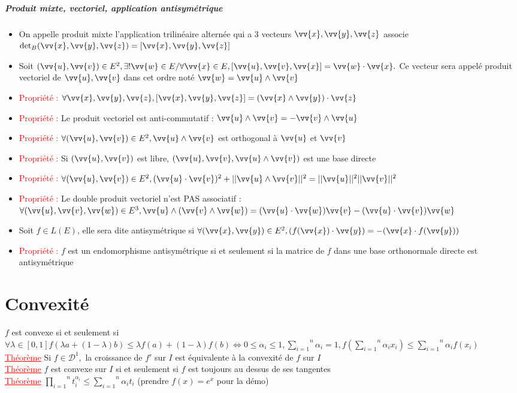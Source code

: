 \documentclass[a4paper, 11pts, french]{article}
\newcommand{\p}{\wedge}
\newcommand{\D}{\mathcal{D}}
\newcommand{\al}{\alpha}
\newcommand{\la}{\lambda}
\newcommand{\som}[2]{\overset{#2}{\underset{#1}{\sum}}}
\newcommand{\produit}[2]{\overset{#2}{\underset{#1}{\prod}}}
\newcommand{\thm}{\textcolor{red}{\underline{Théorème} }}
\newcommand{\ppt}{\textcolor{red}{Propriété : }}
\begin{document}
	 \subparagraph{Produit mixte, vectoriel, application antisymétrique}
	 \begin{itemize}
		\item On appelle produit mixte l'application trilinéaire alternée qui a 3 vecteurs $\vv{x}, \vv{y}, \vv{z}$ associe $\det_B(\vv{x},\vv{y},\vv{z})=[\vv{x},\vv{y},\vv{z}]$
		\item Soit $(\vv{u},\vv{v}) \in E^2, \exists! \vv{w} \in E / \forall \vv{x} \in E, [\vv{u},\vv{v},\vv{x}]=\vv{w}\cdot\vv{x}.$ Ce vecteur sera appelé produit vectoriel de $\vv{u},\vv{v}$ dans cet ordre noté $\vv{w}=\vv{u}\p\vv{v}$
		\item \ppt $\forall \vv{x},\vv{y},\vv{z}, [\vv{x},\vv{y},\vv{z}]=(\vv{x}\p\vv{y})\cdot\vv{z}$
		\item \ppt Le produit vectoriel est anti-commutatif : $\vv{u}\p\vv{v}=-\vv{v}\p\vv{u}$
		\item \ppt $\forall (\vv{u},\vv{v}) \in E^2, \vv{u}\p\vv{v}$ est orthogonal à $\vv{u}$ et $\vv{v}$
		\item \ppt Si $(\vv{u},\vv{v})$ est libre, $(\vv{u},\vv{v},\vv{u}\p\vv{v})$ est une base directe
		\item \ppt $\forall (\vv{u},\vv{v}) \in E^2, (\vv{u}\cdot\vv{v})^2+||\vv{u}\p\vv{v}||^2=||\vv{u}||^2||\vv{v}||^2$
		\item \ppt Le double produit vectoriel n'est PAS associatif : $\forall (\vv{u},\vv{v},\vv{w}) \in E^3,\\ {\vv{u}\p (\vv{v} \p \vv{w})=(\vv{u} \cdot \vv{w})\vv{v}-(\vv{u} \cdot \vv{v})\vv{w}}$
		\item Soit $f \in L(E)$, elle sera dite antisymétrique si $\forall (\vv{x},\vv{y}) \in E^2, (f(\vv{x})\cdot\vv{y})=-(\vv{x}\cdot f(\vv{y}))$
		\item \ppt $f$ est un endomorphisme antisymétrique si et seulement si la matrice de $f$ dans une base orthonormale directe est antisymétrique
	 \end{itemize}


	 \section{Convexité}
	  $f$ est convexe si et seulement si $\forall \la \in [0,1] f(\la a+(1-\la)b) \leqslant \la f(a)+(1-\la)f(b) \iff 0 \leqslant \al_i \leqslant 1, \som{i=1}{n}\al_i=1, f(\som{i=1}{n}\al_i x_i) \leqslant \som{i=1}{n}\al_i f(x_i)$ \\
	  \thm Si $f \in \D^1,$ la croissance de $f'$ sur $I$ est équivalente à la convexité de $f$ sur $I$ \\
	  \thm $f$ est convexe sur $I$ si et seulement si $f$ est toujours au dessus de ses tangentes \\
	  \thm $\produit{i=1}{n}t_i^{\al_i} \leqslant \som{i=1}{n}\al_it_i$ (prendre $f(x)=e^x$ pour la démo)
	 
\end{document}
